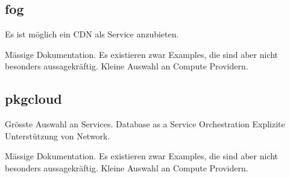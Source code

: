 \documentclass[11pt]{scrartcl}
\begin{document}
\subsection{fog}
\begin{Argumentation}
\pro Es ist möglich ein CDN als Service anzubieten.

\contra Mässige Dokumentation. Es existieren zwar Examples, die sind aber nicht besonders aussagekräftig.
\contra Kleine Auswahl an Compute Providern.
\end{Argumentation}

\subsection{pkgcloud}
\begin{Argumentation}
\pro Grösste Auswahl an Services.
\pro Database as a Service
\pro Orchestration
\pro Explizite Unterstützung von Network.

\contra Mässige Dokumentation. Es existieren zwar Examples, die sind aber nicht besonders aussagekräftig.
\contra Kleine Auswahl an Compute Providern.
\end{Argumentation}
\end{document}
